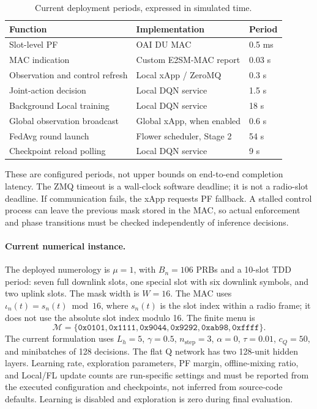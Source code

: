 \begin{EnChapter}
\begin{table}[htbp]
\centering
\small
\caption{Current deployment periods, expressed in simulated time.}
\label{tab:oran-mapping}
\begin{tabular}{@{}p{}p{}p{}@{}}
\toprule
Function & Implementation & Period \\
\midrule
Slot-level PF & OAI DU MAC & 0.5 ms \\
MAC indication & Custom E2SM-MAC report & 0.03 s \\
Observation and control refresh & Local xApp / ZeroMQ & 0.3 s \\
Joint-action decision & Local DQN service & 1.5 s \\
Background Local training & Local DQN service & 18 s \\
Global observation broadcast & Global xApp, when enabled & 0.6 s \\
FedAvg round launch & Flower scheduler, Stage 2 & 54 s \\
Checkpoint reload polling & Local DQN service & 9 s \\
\bottomrule
\end{tabular}
\end{table}
These are configured periods, not upper bounds on end-to-end completion latency.
The ZMQ timeout is a wall-clock software deadline; it is not a radio-slot deadline.
If communication fails, the xApp requests PF fallback. A stalled control process
can leave the previous mask stored in the MAC, so actual enforcement and phase
transitions must be checked independently of inference decisions.

\paragraph{Current numerical instance.}
The deployed numerology is $\mu=1$, with $B_n=106$ PRBs and a 10-slot TDD period:
seven full downlink slots, one special slot with six downlink symbols, and two
uplink slots. The mask width is $W=16$. The MAC uses
$\iota_n(t)=s_n(t)\bmod16$, where $s_n(t)$ is the slot index within a radio frame;
it does not use the absolute slot index modulo 16. The finite menu is
\begin{equation}
  \mathcal{M}=\{\mathtt{0x0101},\mathtt{0x1111},\mathtt{0x9044},
                 \mathtt{0x9292},\mathtt{0xab98},\mathtt{0xffff}\}.
\end{equation}
The current formulation uses $L_h=5$, $\gamma=0.5$, $n_{\mathrm{step}}=3$,
$\alpha=0$, $\tau=0.01$, $c_Q=50$, and minibatches of 128 decisions. The flat
Q network has two 128-unit hidden layers. Learning rate, exploration parameters,
PF margin, offline-mixing ratio, and Local/FL update counts are run-specific
settings and must be reported from the executed configuration and checkpoints,
not inferred from source-code defaults. Learning is disabled and exploration is
zero during final evaluation.


\end{EnChapter}
